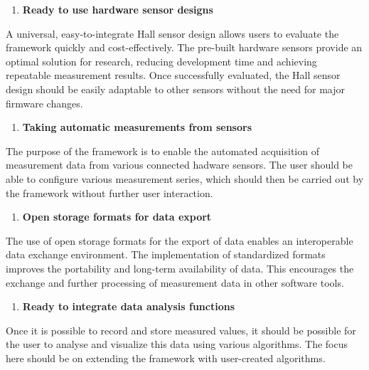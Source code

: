 \begin{enumerate}
\def\labelenumi{\arabic{enumi}.}
\tightlist
\item
  \textbf{Ready to use hardware sensor designs}
\end{enumerate}

A universal, easy-to-integrate Hall sensor design allows users to
evaluate the framework quickly and cost-effectively. The pre-built
hardware sensors provide an optimal solution for research, reducing
development time and achieving repeatable measurement results. Once
successfully evaluated, the Hall sensor design should be easily
adaptable to other sensors without the need for major firmware changes.

\begin{enumerate}
\def\labelenumi{\arabic{enumi}.}
\setcounter{enumi}{1}
\tightlist
\item
  \textbf{Taking automatic measurements from sensors}
\end{enumerate}

The purpose of the framework is to enable the automated acquisition of
measurement data from various connected hadware sensors. The user should
be able to configure various measurement series, which should then be
carried out by the framework without further user interaction.

\begin{enumerate}
\def\labelenumi{\arabic{enumi}.}
\setcounter{enumi}{2}
\tightlist
\item
  \textbf{Open storage formats for data export}
\end{enumerate}

The use of open storage formats for the export of data enables an
interoperable data exchange environment. The implementation of
standardized formats improves the portability and long-term availability
of data. This encourages the exchange and further processing of
measurement data in other software tools.

\begin{enumerate}
\def\labelenumi{\arabic{enumi}.}
\setcounter{enumi}{3}
\tightlist
\item
  \textbf{Ready to integrate data analysis functions}
\end{enumerate}

Once it is possible to record and store measured values, it should be
possible for the user to analyse and visualize this data using various
algorithms. The focus here should be on extending the framework with
user-created algorithms.

